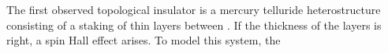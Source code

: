 The first observed topological insulator is a mercury telluride heterostructure consisting of a staking of thin  layers between  \cite{kane_this_2011}. If the thickness of the  layers is right, a spin Hall effect arises. To model this system, the 